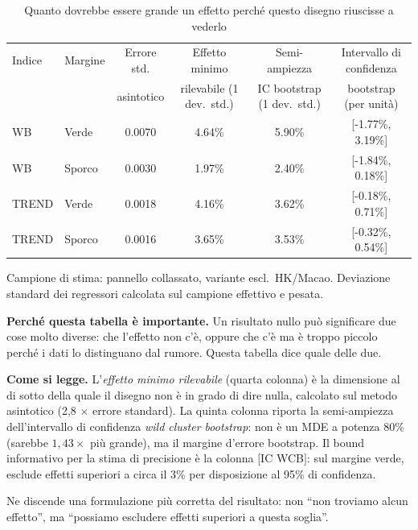 \begin{table}[htbp]
\centering
\footnotesize
\caption{Quanto dovrebbe essere grande un effetto perch\'e questo disegno riuscisse a vederlo}
\label{tab:mde}
\begin{threeparttable}
\begin{tabular}{llcccc}
\toprule
Indice & Margine & Errore std. & Effetto minimo & Semi-ampiezza & Intervallo di confidenza \\
 & & asintotico & rilevabile (1 dev.\ std.) & IC bootstrap (1 dev.\ std.) & bootstrap (per unit\`a) \\
\midrule
WB & Verde & 0.0070 & 4.64\% & 5.90\% & [-1.77\%, 3.19\%] \\
WB & Sporco & 0.0030 & 1.97\% & 2.40\% & [-1.84\%, 0.18\%] \\
TREND & Verde & 0.0018 & 4.16\% & 3.62\% & [-0.18\%, 0.71\%] \\
TREND & Sporco & 0.0016 & 3.65\% & 3.53\% & [-0.32\%, 0.54\%] \\
\bottomrule
\end{tabular}
\begin{tablenotes}[flushleft]\footnotesize
\item Campione di stima: pannello collassato, variante escl.\ HK/Macao. Deviazione standard dei regressori calcolata sul campione effettivo e pesata.
\item \textbf{Perch\'e questa tabella \`e importante.} Un risultato nullo pu\`o significare due cose molto diverse: che l'effetto non c'\`e, oppure che c'\`e ma \`e troppo piccolo perch\'e i dati lo distinguano dal rumore. Questa tabella dice quale delle due.
\item \textbf{Come si legge.} L'\emph{effetto minimo rilevabile} (quarta colonna) \`e la dimensione al di sotto della quale il disegno non \`e in grado di dire nulla, calcolato sul metodo asintotico (2{,}8 $\times$ errore standard). La quinta colonna riporta la semi-ampiezza dell'intervallo di confidenza \emph{wild cluster bootstrap}: non \`e un MDE a potenza 80\% (sarebbe $1{,}43\times$ pi\`u grande), ma il margine d'errore bootstrap. Il bound informativo per la stima di precisione \`e la colonna $[$IC WCB$]$: sul margine verde, esclude effetti superiori a circa il 3\% per disposizione al 95\% di confidenza.
\item Ne discende una formulazione pi\`u corretta del risultato: non ``non troviamo alcun effetto'', ma ``possiamo escludere effetti superiori a questa soglia''.
\end{tablenotes}
\end{threeparttable}
\end{table}
